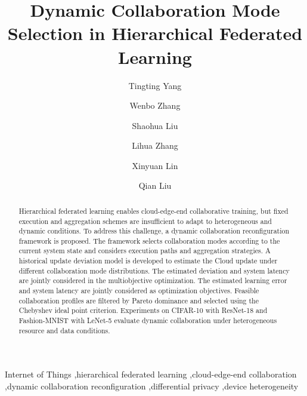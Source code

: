 \documentclass[5p,times]{elsarticle}
\theoremstyle{plain}
\theoremstyle{definition}
\theoremstyle{remark}
\begin{document}
\begin{frontmatter}

\title{Dynamic Collaboration Mode Selection in Hierarchical Federated Learning}

\author[bupt1,bupt2,bupt3]{Tingting Yang}
\author[bupt1,bupt2,bupt3]{Wenbo Zhang}
\author[bupt1,bupt2,bupt3]{Shaohua Liu}
\author[bupt1,bupt2,bupt3]{Lihua Zhang}
\author[bupt1,bupt2,bupt3]{Xinyuan Lin}
\author[bupt1,bupt2,bupt3]{Qian Liu}




\begin{abstract}
Hierarchical federated learning enables cloud-edge-end collaborative training, but fixed execution and aggregation schemes are insufficient to adapt to heterogeneous and dynamic conditions.
To address this challenge, a dynamic collaboration reconfiguration framework is proposed.
The framework selects collaboration modes according to the current system state and considers execution paths and aggregation strategies.
A historical update deviation model is developed
to estimate the Cloud update under different
collaboration mode distributions. The estimated
deviation and system latency are jointly considered
in the multiobjective optimization.
The estimated learning error and system latency are jointly considered as optimization objectives.
Feasible collaboration profiles are filtered by Pareto dominance and selected using the Chebyshev ideal point criterion.
Experiments on CIFAR-10 with ResNet-18 and Fashion-MNIST with LeNet-5 evaluate dynamic collaboration under heterogeneous resource and data conditions.
\end{abstract}

\begin{keyword} 
Internet of Things \sep hierarchical federated learning \sep cloud-edge-end collaboration \sep dynamic collaboration reconfiguration \sep differential privacy \sep device heterogeneity 
\end{keyword}

\end{frontmatter}
\end{document}
